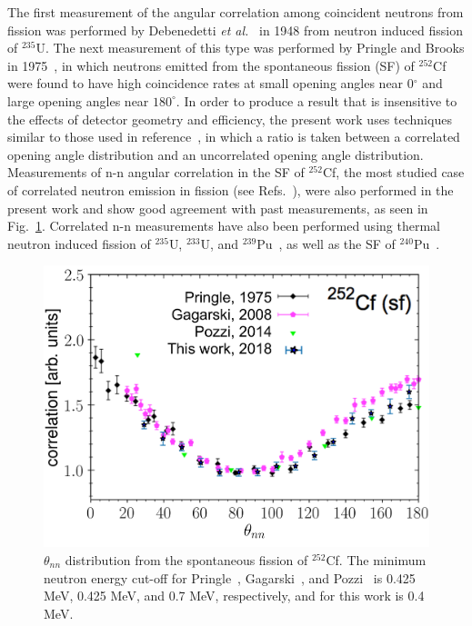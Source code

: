 The first measurement of the angular correlation among coincident neutrons from fission was performed by Debenedetti \emph{et al.}~\cite{1948twoNCorr} in 1948 from neutron induced fission of $^{235}\text{U}$.
The next measurement of this type was performed by Pringle and Brooks in 1975~\cite{1975Cf252}, in which neutrons emitted from the spontaneous fission (SF) of $^{252}$Cf were found to have high coincidence rates at small opening angles near 0$^{\circ}$ and large opening angles near $180^{\circ}$.
In order to produce a result that is insensitive to the effects of detector geometry and efficiency, the present work uses techniques similar to those used in reference~\cite{1975Cf252}, in which a ratio is taken between a correlated opening angle distribution and an uncorrelated opening angle distribution.
Measurements of n-n angular correlation in the SF of $^{252}$Cf, the most studied case of correlated neutron emission in fission (see Refs.~\cite{1975Cf252, Pozzi2014, 2008CF252, Verbeke2018}), were also performed in the present work and show good agreement with past measurements, as seen in Fig.~\ref{fig:Cf252_us_vs_them}.
Correlated n-n measurements have also been performed using thermal neutron induced fission of $^{235}$U, $^{233}$U, and $^{239}$Pu~\cite{Sokolov2010}, as well as the SF of $^{240}$Pu~\cite{Pozzi2016}.
\begin{figure}[h]
\centering
\includegraphics[width=\figsmall\textwidth]{Cf252_us_vs_them.png}
\caption{$\theta_{nn}$ distribution from the spontaneous fission of $^{252}$Cf.
 The minimum neutron energy cut-off for Pringle~\cite{1975Cf252}, Gagarski~\cite{2008CF252}, and Pozzi~\cite{Pozzi2016} is 0.425 MeV, 0.425 MeV, and 0.7 MeV, respectively, and for this work is 0.4 MeV.
}
\label{fig:Cf252_us_vs_them}
\end{figure}

